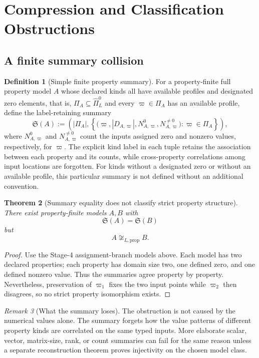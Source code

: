 \documentclass[11pt]{article}
\newcommand{\PiZero}{\widehat{\Pi}_{L}^{0}}
\newtheorem{theorem}{Theorem}[section]
\theoremstyle{definition}
\newtheorem{definition}[theorem]{Definition}
\theoremstyle{remark}
\newtheorem{remark}[theorem]{Remark}
\begin{document}
\section{Compression and Classification Obstructions}
\label{sec:compression}

\subsection{A finite summary collision}

\begin{definition}[Simple finite property summary]
For a property-finite full property model \(A\) whose declared kinds all have available profiles and designated zero elements, that is,
\(\Pi_A\subseteq\PiZero\) and every \(\varpi\in\Pi_A\) has an available profile, define the label-retaining summary
\[
\mathfrak S(A):=
\left(
|\Pi_A|,
\left\{
\bigl(\varpi,|D_{A,\varpi}|,N^0_{A,\varpi},N^{\neq0}_{A,\varpi}\bigr)
:\varpi\in\Pi_A
\right\}
\right),
\]
where \(N^0_{A,\varpi}\) and \(N^{\neq0}_{A,\varpi}\) count the inputs assigned zero and nonzero values, respectively, for \(\varpi\).
The explicit kind label in each tuple retains the association between each property and its counts, while cross-property correlations among input locations are forgotten.
For kinds without a designated zero or without an available profile, this particular summary is not defined without an additional convention.
\end{definition}

\begin{theorem}[Summary equality does not classify strict property structure]
\label{thm:compression}
There exist property-finite models \(A,B\) with
\[
\mathfrak S(A)=\mathfrak S(B)
\]
but
\[
A\not\cong_{L,\mathrm{prop}}B.
\]
\end{theorem}

\begin{proof}
Use the Stage-4 assignment-branch models above.
Each model has two declared properties; each property has domain size two, one defined zero, and one defined nonzero value.
Thus the summaries agree property by property.
Nevertheless, preservation of \(\varpi_1\) fixes the two input points while \(\varpi_2\) then disagrees, so no strict property isomorphism exists.
\end{proof}

\begin{remark}[What the summary loses]
The obstruction is not caused by the numerical values alone.
The summary forgets how the value patterns of different property kinds are correlated on the same typed inputs.
More elaborate scalar, vector, matrix-size, rank, or count summaries can fail for the same reason unless a separate reconstruction theorem proves injectivity on the chosen model class.
\end{remark}
\end{document}
